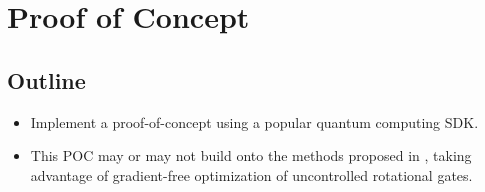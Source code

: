 \chapter{Proof of Concept}
\label{chap:proof-of-concept}

\section{Outline}
\begin{itemize}
    \item
        Implement a proof-of-concept using a popular quantum computing SDK.
    \item
        This POC may or may not build onto the methods proposed in
        \cite{wendenius_gradient-free_2023,ostaszewski_structure_2021},
        taking advantage of gradient-free optimization of uncontrolled
        rotational gates.
\end{itemize}